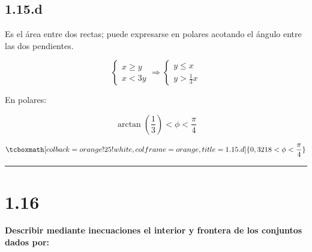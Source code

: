 \documentclass{article}
\begin{document}
\subsection*{1.15.d}
\label{subsec:1.15.d}

Es el área entre dos rectas; puede expresarse en polares acotando el ángulo entre las dos pendientes.

\begin{equation}
\left\{
\begin{array}{ll}
x \geq y \\
x < 3y
\end{array}
\right. \Rightarrow \left\{
\begin{array}{ll}
y \leq x \\
y > \frac{1}{3} x
\end{array}
\right.
\end{equation}

En polares:

\begin{equation}
\arctan \left( \frac{1}{3} \right) < \phi < \frac{\pi}{4}
\end{equation}

\begin{equation}
\tcboxmath[colback=orange!25!white,colframe=orange,title=1.15.d]
{ 0,3218 < \phi < \frac{\pi}{4} }
\end{equation}

\hrule
\vspace{10 pt}

\section*{1.16}
\label{sec:1.16}

\textbf{Describir mediante inecuaciones el interior y frontera de los conjuntos dados por:}
\end{document}
